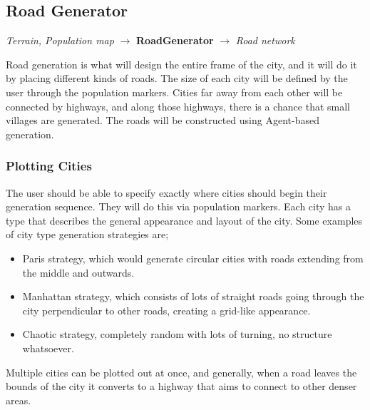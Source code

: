 \subsection{Road Generator}
\begin{center}
  \textit{Terrain, Population map} $\rightarrow$ \textbf{RoadGenerator} $\rightarrow$ \textit{Road network} 
\end{center}
Road generation is what will design the entire frame of the city, and it will do it by placing different kinds of roads.
The size of each city will be defined by the user through the population markers.
Cities far away from each other will be connected by highways, and along those highways, there is a chance that small villages are generated.
The roads will be constructed using Agent-based generation.



\subsubsection{Plotting Cities}
The user should be able to specify exactly where cities should begin their generation sequence.
They will do this via population markers.
Each city has a type that describes the general appearance and layout of the city.
Some examples of city type generation strategies are;
\begin{itemize}
  \item Paris strategy, which would generate circular cities with roads extending from the middle and outwards.
  \item Manhattan strategy, which consists of lots of straight roads going through the city perpendicular to other roads, creating a grid-like appearance.
  \item Chaotic strategy, completely random with lots of turning, no structure whatsoever.
\end{itemize}

Multiple cities can be plotted out at once, and generally, when a road leaves the bounds of the city it converts to a highway that aims to connect to other denser areas.

